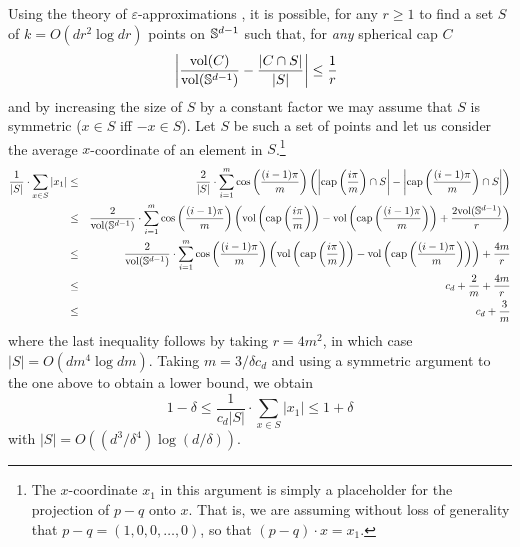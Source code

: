 \documentclass[charterfonts,lotsofwhite]{patmorin}
\newcommand{\eps}{\varepsilon}
\begin{document}
Using the theory of $\eps$-approximations \cite[Chapter~4]{c00}, it is
possible, for any $r\ge 1$ to find a set $S$ of $k=O(dr^2\log dr)$
points on $\mathbb{S}^{d-1}$ such that, for \emph{any} spherical cap $C$
\[
    \left|\frac{\mathrm{vol}(C)}{\mathrm{vol}(\mathbb{S}^{d-1})} - \frac{|C\cap S|}{|S|} \right| 
              \le \frac{1}{r}  \enspace 
\]
and by increasing the size of $S$ by a constant factor we may assume
that $S$ is symmetric ($x\in S$ iff $-x\in S$).
Let $S$ be such a set of points and let us consider the average
$x$-coordinate of an element in $S$.\footnote{The $x$-coordinate $x_1$
in this argument is simply a placeholder for the projection of $p-q$
onto $x$. That is, we are assuming without loss of generality that
$p-q=(1,0,0,\ldots,0)$, so that $(p-q)\cdot x=x_1$.}
\begin{eqnarray*}
\frac{1}{|S|}\cdot \sum_{x\in S} |x_1|
  \comment{ & = & \frac{2}{|S|}\cdot\sum_{i=1}^m
          \sum\left\{x_1: x\in
              S\cap\ccap\left(\frac{i\pi}{m}\right) 
                \setminus\ccap\left(\frac{(i-1)\pi}{m}\right)
          \right\} \\ }
  & \le & \frac{2}{|S|}\cdot
         \sum_{i=1}^m\cos\left(\frac{(i-1)\pi}{m}\right)
           \left(
             \left|\ccap\left(\frac{i\pi}{m}\right)\cap S\right| -
             \left|\ccap\left(\frac{(i-1)\pi}{m}\right)\cap S\right|
           \right) \\
  & \le & \frac{2}{\area(\Sd)}\cdot
         \sum_{i=1}^m\cos\left(\frac{(i-1)\pi}{m}\right)
           \left(
             \area\left(\ccap\left(\frac{i\pi}{m}\right)\right) -
             \area\left(\ccap\left(\frac{(i-1)\pi}{m}\right)\right) +
             \frac{2\area(\Sd)}{r}
           \right) \\
  & \le & \frac{2}{\area(\Sd)}\cdot
         \sum_{i=1}^m\cos\left(\frac{(i-1)\pi}{m}\right)
           \left(
             \area\left(\ccap\left(\frac{i\pi}{m}\right)\right) -
             \area\left(\ccap\left(\frac{(i-1)\pi}{m}\right)\right)
           \right) + \frac{4m}{r} \\
  & \le & c_d + \frac{2}{m} + \frac{4m}{r} \\
  & \le & c_d + \frac{3}{m} 
\end{eqnarray*}
where the last inequality follows by taking $r=4m^2$, in which case
$|S|=O(dm^4\log dm)$.  Taking $m=3/\delta c_d$ and using a symmetric
argument to the one above to obtain a lower bound, we obtain
\[
  1-\delta \le \frac{1}{c_d|S|}\cdot\sum_{x\in S}|x_1| \le 1 + \delta
\]
with $|S|=O((d^3/\delta^4)\log(d/\delta))$.  
\end{document}
